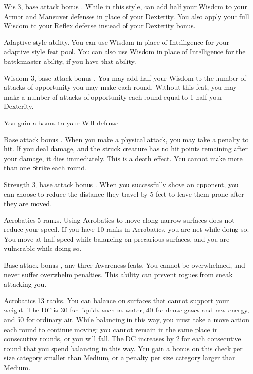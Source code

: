 \featpre Wis 3, base attack bonus .
\featben While in this style, can add half your Wisdom to your Armor and Maneuver defenses in place of your Dexterity. You also apply your full Wisdom to your Reflex defense instead of your Dexterity bonus. 

\featpre Adaptive style ability.
\featben You can use Wisdom in place of Intelligence for your adaptive style feat pool. You can also use Wisdom in place of Intelligence for the battlemaster ability, if you have that ability.

\featpres Wisdom 3, base attack bonus .
\featben You may add half your Wisdom to the number of attacks of opportunity you may make each round.
 Without this feat, you may make a number of attacks of opportunity each round equal to 1 \add half your Dexterity.

 You gain a  bonus to your Will defense.

\featpre Base attack bonus .
\featben When you make a physical attack, you may take a  penalty to hit. If you deal damage, and the struck creature has no hit points remaining after your damage, it dies immediately. This is a death effect. You cannot make more than one Strike each round.

\featpres Strength 3, base attack bonus .
\featben When you successfully shove an opponent, you can choose to reduce the distance they travel by 5 feet to leave them prone after they are moved.

\featpre Acrobatics 5 ranks.
\featben Using Acrobatics to move along narrow surfaces does not reduce your speed. If you have 10 ranks in Acrobatics, you are not \vulnerable while doing so.
 You move at half speed while balancing on precarious surfaces, and you are vulnerable while doing so.

\featpre Base attack bonus , any three Awareness feats.
\featben You cannot be overwhelmed, and never suffer overwhelm penalties. This ability can prevent rogues from sneak attacking you.

\featpre Acrobatics 13 ranks.
\featben You can balance on surfaces that cannot support your weight. The DC is 30 for liquids such as water, 40 for dense gases and raw energy, and 50 for ordinary air. While balancing in this way, you must take a move action each round to continue moving; you cannot remain in the same place in consecutive rounds, or you will fall. The DC increases by 2 for each consecutive round that you spend balancing in this way. You gain a  bonus on this check per size category smaller than Medium, or a  penalty per size category larger than Medium.

